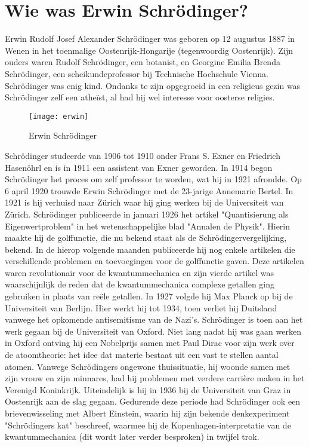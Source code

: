 \documentclass[11pt,fleqn]{book} %
\begin{document}
\section{Wie was Erwin Schrödinger?}
Erwin Rudolf Josef Alexander Schrödinger was geboren op 12 augustus 1887 in Wenen in het toenmalige Oostenrijk-Hongarije (tegenwoordig Oostenrijk). Zijn ouders waren Rudolf Schrödinger, een botanist, en Georgine Emilia Brenda Schrödinger, een scheikundeprofessor bij Technische Hochschule Vienna. Schrödinger was enig kind. Ondanks te zijn opgegroeid in een religieus gezin was Schrödinger zelf een atheïst, al had hij wel interesse voor oosterse religies.
\begin{figure}[h]
	\centering\texttt{[image: erwin]}
	\caption{Erwin Schrödinger}
	\label{fig:erwin}
\end{figure}
Schrödinger studeerde van 1906 tot 1910 onder Frans S. Exner en Friedrich Hasenöhrl en is in 1911 een assistent van Exner geworden. In 1914 begon Schrödinger het proces om zelf professor te worden, wat hij in 1921 afrondde. Op 6 april 1920 trouwde Erwin Schrödinger met de 23-jarige Annemarie Bertel. In 1921 is hij verhuisd naar Zürich waar hij ging werken bij de Universiteit van Zürich. 
Schrödinger publiceerde in januari 1926 het artikel "Quantisierung als Eigenwertproblem" in het wetenschappelijke blad "Annalen de Physik". Hierin maakte hij de golffunctie, die nu bekend staat als de Schrödingervergelijking, bekend. In de hierop volgende maanden publiceerde hij nog enkele artikelen die verschillende problemen en toevoegingen voor de golffunctie gaven. Deze artikelen waren revolutionair voor de kwantummechanica en zijn vierde artikel was waarschijnlijk de reden dat de kwantummechanica complexe getallen ging gebruiken in plaats van reële getallen.
In 1927 volgde hij Max Planck op bij de Universiteit van Berlijn. Hier werkt hij tot 1934, toen verliet hij Duitsland vanwege het opkomende antisemitisme van de Nazi's. Schrödinger is toen aan het werk gegaan bij de Universiteit van Oxford. Niet lang nadat hij was gaan werken in Oxford ontving hij een Nobelprijs samen met Paul Dirac voor zijn werk over de atoomtheorie: het idee dat materie bestaat uit een vast te stellen aantal atomen. Vanwege Schrödingers ongewone thuissituatie, hij woonde samen met zijn vrouw en zijn minnares, had hij problemen met verdere carrière maken in het Verenigd Koninkrijk. Uiteindelijk is hij in 1936 bij de Universiteit van Graz in Oostenrijk aan de slag gegaan. Gedurende deze periode had Schrödinger ook een brievenwisseling met Albert Einstein, waarin hij zijn bekende denkexperiment "Schrödingers kat" beschreef, waarmee hij de Kopenhagen-interpretatie van de kwantummechanica (dit wordt later verder besproken) in twijfel trok.
\end{document}
